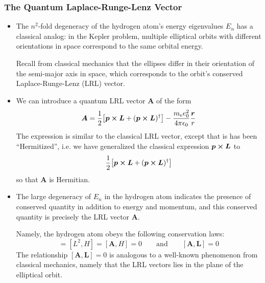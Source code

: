 \documentclass[11pt, a4paper]{article}
\newcommand{\eqtext}[1]{\qquad \text{#1} \qquad}
\renewcommand{\vec}[1]{\bm{#1}}  %
\renewcommand{\r}{\vec{r}}  %
\renewcommand{\L}{\vec{L}}  %
\begin{document}
\subsubsection{The Quantum Laplace-Runge-Lenz Vector}
\begin{itemize}
	\item The $ n^{2} $-fold degeneracy of the hydrogen atom's energy eigenvalues $ E_{n} $ has a classical analog: in the Kepler problem, multiple elliptical orbits with different orientations in space correspond to the same orbital energy. 
	
	Recall from classical mechanics that the ellipses differ in their orientation of the semi-major axis in space, which corresponds to the orbit's conserved Laplace-Runge-Lenz (LRL) vector. 
	
	\item We can introduce a quantum LRL vector $ \vec{A} $ of the form
	\begin{equation*}
		\vec{A} = \frac{1}{2} \big[\vec{p} \cross \L + (\vec{p}\cross \L)^{\dagger}\big] - \frac{m_{\text{e}}e_{0}^{2}}{4\pi \epsilon_{0}} \frac{\r}{r}
	\end{equation*}
	The expression is similar to the classical LRL vector, except that is has been ``Hermitized'', i.e. we have generalized the classical expression $ \vec{p}\cross \vec{L} $ to 
	\begin{equation*}
		\frac{1}{2} \big[\vec{p} \cross \L + (\vec{p}\cross \L)^{\dagger}\big] 
	\end{equation*}
	so that $ \vec{A} $ is Hermitian. 
	
	\item The large degeneracy of $ E_{n} $ in the hydrogen atom indicates the presence of conserved quantity in addition to energy and momentum, and this conserved quantity is precisely the LRL vector $ \vec{A} $. 
	
	Namely, the hydrogen atom obeys the following conservation laws:
	\begin{equation*}
		[\L, H] = [L^{2}, H]  = [\vec{A}, H] = 0 \eqtext{and} [\vec{A}, \L] = 0
	\end{equation*}
	The relationship $ [\vec{A}, \L] = 0 $ is analogous to a well-known phenomenon from classical mechanics, namely that the LRL vectors lies in the plane of the elliptical orbit.
	
\end{itemize}

\newpage
\end{document}
